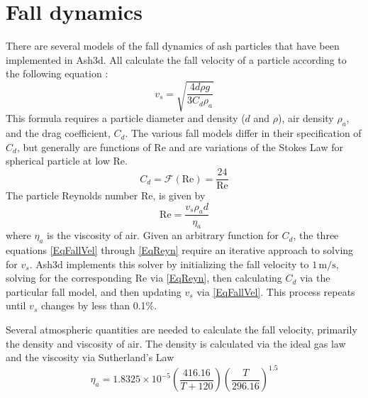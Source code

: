 \chapter{Fall dynamics}\label{ChapAppendFallDynamics}

There are several models of the fall dynamics of ash particles that have
been implemented in Ash3d.  All calculate the fall velocity of a particle
according to the following equation \cite[p.182]{Bird1960}:
\begin{equation}
v_s=\sqrt{\frac{4d\rho g}{3C_d\rho_a}}\label{EqFallVel}
\end{equation}
This formula requires a particle diameter and density ($d$ and $\rho$),
air density $\rho_a$, and the drag coefficient, $C_d$.
The various fall models differ in their
specification of $C_d$, but generally are functions of $\mathrm{Re}$
and are variations of the Stokes Law
for spherical particle at low $\mathrm{Re}$.
\begin{equation}
C_d = \mathcal{F}(\mathrm{Re}) = \frac{24}{\mathrm{Re}}\label{EqCdStokes}
\end{equation}
The particle Reynolds number $\mathrm{Re}$, is given by 
\begin{equation}
\mathrm{Re}=\frac{v_s\rho_a d}{\eta_a}\label{EqReyn}
\end{equation}
where $\eta_a$ is the viscosity of air.  Given an arbitrary function
for $C_d$, the three equations \ref{EqFallVel} through \ref{EqReyn}
require an iterative approach to solving for $v_s$.  Ash3d implements
this solver by initializing the fall velocity to $1 \, \mathrm{m/s}$,
solving for the corresponding $\mathrm{Re}$ via \ref{EqReyn}, then
calculating $C_d$ via the particular fall model, and then updating
$v_s$ via \ref {EqFallVel}.  This process repeats until $v_s$ changes
by less than 0.1\%.

Several atmospheric quantities are needed to calculate the fall velocity,
primarily the density and viscosity of air.
The density is calculated via the ideal gas law and the viscosity via
Sutherland's Law \cite[p.102, Eq.4.54]{Jacobson2005}
\begin{equation}
\eta_a= 1.8325 \times 10^{-5} \left( \frac{416.16}{T+120}\right) 
\left( \frac{T}{296.16}\right)^{1.5}
\end{equation}

